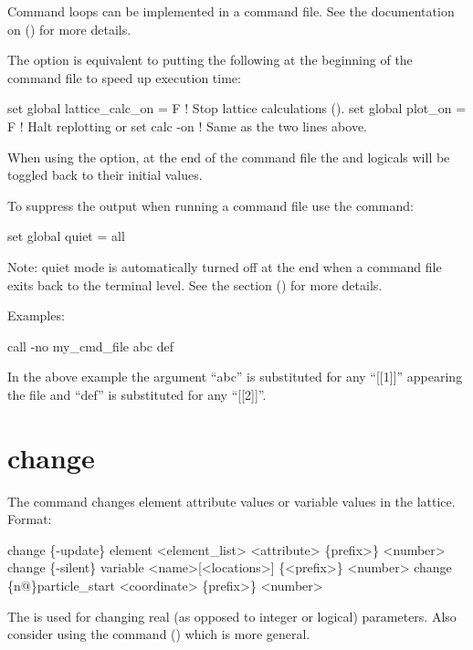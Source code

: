 Command loops can be implemented in a command file. See the documentation on 
() for more details.

The  option is equivalent to putting the following at the beginning of the
command file to speed up execution time:
\begin{example}
  set global lattice_calc_on = F   ! Stop lattice calculations ().
  set global plot_on = F           ! Halt replotting 
or
  set calc -on                     ! Same as the two lines above.
\end{example}
When using the  option, at the end of the command file the  and
 logicals will be toggled back to their initial values.

To suppress the output when running a command file use the command:
\begin{example}
  set global quiet = all
\end{example}
Note: quiet mode is automatically turned off at the end when a command file exits back to the
terminal level. See the  section () for
more details.

Examples:
\begin{example}
    call -no my_cmd_file abc def 
\end{example}
In the above example the argument ``abc'' is substituted for any ``[[1]]'' appearing the
file and ``def'' is substituted for any ``[[2]]''.  \Newline

\section{change}
\label{s:change}

The  command changes element attribute values or variable values in the 
lattice. Format:
\begin{example}
  change \{-update\} element <element_list> <attribute> \{prefix>\} <number>
  change \{-silent\} variable <name>[<locations>] \{<prefix>\} <number>
  change  \{n@\}particle_start <coordinate> \{prefix>\} <number>
\end{example}

\vskip 10pt 
The  is used for changing real (as opposed to integer or logical) parameters. Also
consider using the  command () which is more general.


